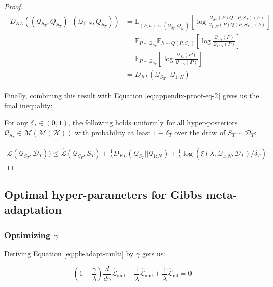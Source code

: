 \documentclass{article}
\theoremstyle{definition}
\newcommand{\Expect}[2]{\mathbb{E}_{#1}\left [#2 \right ]}
\begin{document}
\begin{proof}
	\begin{align*}
	\begin{split}
	D_{KL}((\mathcal{Q}_{S_T}, Q_{S_T})||(\mathcal{Q}_{1:N}, Q_{S_T}))&=\Expect{(P,h)\sim (\mathcal{Q}_{S_T},Q_{S_T})}{\log\frac{\mathcal{Q}_{S_T}(P)Q(P, S_T)(h)}{\mathcal{Q}_{1:N}(P)Q(P, S_T)(h)}}\\
	&=\mathbb{E}_{P\sim \mathcal{Q}_{S_T}}\Expect{h\sim Q(P,S_T)}{\log\frac{\mathcal{Q}_{S_T}(P)}{\mathcal{Q}_{1:N}(P)}}\\
	&=\Expect{P\sim \mathcal{Q}_{S_T}}{\log\frac{\mathcal{Q}_{S_T}(P)}{\mathcal{Q}_{1:N}(P)}}\\
	&=D_{KL}(\mathcal{Q}_{S_T}||\mathcal{Q}_{1:N})
	\end{split}
	\end{align*}
	
	Finally, combining this result with Equation \ref{eq:appendix-proof-eq-2} gives us the final inequality:
	
	For any $\delta_T \in (0,1)$, the following holds uniformly for all hyper-posteriors $\mathcal{Q}_{S_T}\in \mathcal{M}(\mathcal{M}(\mathcal{H}))$ with probability at least $1-\delta_T$ over the draw of $S_T\sim \mathcal{D}_T$:
	
	\begin{align*}
	\mathcal{L}(\mathcal{Q}_{S_T}, \mathcal{D}_T)) \leq \hat{\mathcal{L}}(\mathcal{Q}_{S_T}, S_T) + \frac{1}{\lambda}D_{KL}(\mathcal{Q}_{S_T}||\mathcal{Q}_{1:N})
	+\frac{1}{\lambda}\log\left (\tilde{\xi}(\lambda,\mathcal{Q}_{1:N},\mathcal{D}_T)/\delta_T\right )
	\end{align*}
	\end{proof}

\subsection{Optimal hyper-parameters for Gibbs meta-adaptation} \label{append:optimiziation}

\subsubsection{Optimizing $\gamma$}

Deriving Equation \ref{eq:pb-adapt-multi} by $\gamma$ gets us:

\begin{equation} \label{eq:gamma-deriv}
(1-\frac{\gamma}{\lambda})\frac{d}{d\gamma}\hat{\mathcal{L}}_{\mathrm{aml}} -\frac{1}{\lambda}\hat{\mathcal{L}}_{\mathrm{aml}} +\frac{1}{\lambda}\hat{\mathcal{L}}_{\mathrm{ml}} =0
\end{equation}
\end{document}
